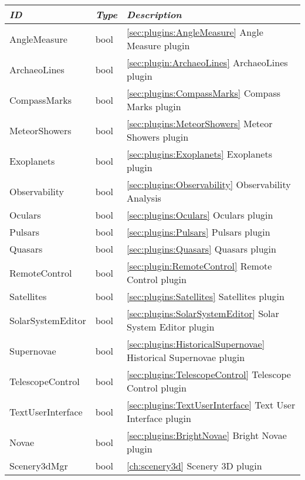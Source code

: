 \begin{longtabu} to \textwidth {l|l|X}
\toprule
\emph{ID} & \emph{Type} & \emph{Description}\\\midrule
AngleMeasure          & bool & \ref{sec:plugins:AngleMeasure} Angle Measure plugin\\\midrule
ArchaeoLines          & bool & \ref{sec:plugin:ArchaeoLines} ArchaeoLines plugin\\\midrule
CompassMarks          & bool & \ref{sec:plugins:CompassMarks} Compass Marks plugin\\\midrule
MeteorShowers         & bool & \ref{sec:plugins:MeteorShowers} Meteor Showers plugin \\\midrule
Exoplanets            & bool & \ref{sec:plugins:Exoplanets} Exoplanets plugin \\\midrule
Observability         & bool & \ref{sec:plugins:Observability} Observability Analysis\\\midrule
Oculars               & bool & \ref{sec:plugins:Oculars} Oculars plugin \\\midrule
Pulsars               & bool & \ref{sec:plugins:Pulsars} Pulsars plugin \\\midrule
Quasars               & bool & \ref{sec:plugins:Quasars} Quasars plugin \\\midrule
RemoteControl         & bool & \ref{sec:plugin:RemoteControl} Remote Control plugin \\\midrule
Satellites            & bool & \ref{sec:plugins:Satellites} Satellites plugin \\\midrule
SolarSystemEditor     & bool & \ref{sec:plugins:SolarSystemEditor} Solar System Editor plugin\\\midrule
Supernovae            & bool & \ref{sec:plugins:HistoricalSupernovae} Historical Supernovae plugin \\\midrule
TelescopeControl      & bool & \ref{sec:plugins:TelescopeControl} Telescope Control plugin \\\midrule
TextUserInterface     & bool & \ref{sec:plugins:TextUserInterface} Text User Interface plugin \\\midrule
Novae                 & bool & \ref{sec:plugins:BrightNovae} Bright Novae plugin \\\midrule
Scenery3dMgr          & bool & \ref{ch:scenery3d} Scenery 3D plugin \\\bottomrule
\end{longtabu}

